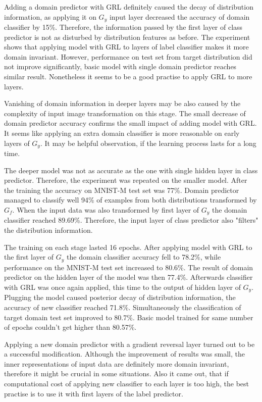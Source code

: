 \documentclass{article}
\begin{document}
\par
Adding a domain predictor with GRL definitely caused the decay of distribution information, as applying it on $G_{y}$ input layer decreased the accuracy of domain classifier by 15\%. Therefore, the information passed by the first layer of class predictor is not as disturbed by distribution features as before. The experiment shows that applying model with GRL to layers of label classifier makes it more domain invariant. However, performance on test set from target distribution did not improve significantly, basic model with single domain predictor reaches similar result. Nonetheless it seems to be a good practise to apply GRL to more layers.
\par
Vanishing of domain information in deeper layers may be also caused by the complexity of input image transformation on this stage. The small decrease of domain predictor accuracy confirms the small impact of adding model with GRL. It seems like applying an extra domain classifier is more reasonable on early layers of $G_{y}$. It may be helpful observation, if the learning process lasts for a long time. 
\par
The deeper model was not as accurate as the one with single hidden layer in class predictor. Therefore, the experiment was repeated on the smaller model. After the training the accuracy on MNIST-M test set was 77\%. Domain predictor managed to classify well 94\% of examples from both distributions transformed by $G_{f}$. When the input data was also transformed by first layer of $G_{y}$ the domain classifier reached 89.69\%. Therefore, the input layer of class predictor also "filters" the distribution information.
\par
The training on each stage lasted 16 epochs. After applying model with GRL to the first layer of $G_{y}$ the domain classifier accuracy fell to 78.2\%, while performance on the MNIST-M test set increased to 80.6\%. The result of domain predictor on the hidden layer of the model was then 77.4\%. Afterwards classifier with GRL was once again applied, this time to the output of hidden layer of $G_{y}$. Plugging the model caused posterior decay of distribution information, the accuracy of new classifier reached 71.8\%. Simultaneously the classification of target domain test set improved to 80.7\%. Basic model trained for same number of epochs couldn't get higher than 80.57\%.
\par
Applying a new domain predictor with a gradient reversal layer turned out to be a successful modification. Although the improvement of results was small, the inner representations of input data are definitely more domain invariant, therefore it might be crucial in some situations. Also it came out, that if computational cost of applying new classifier to each layer is too high, the best practise is to use it with first layers of the label predictor.
\end{document}
